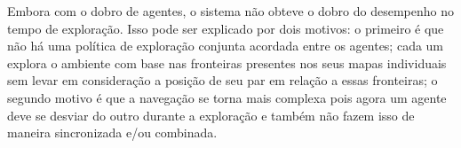 Embora com o dobro de agentes, o sistema não obteve o dobro do 
desempenho no tempo de exploração. Isso pode ser explicado por dois motivos: o primeiro é que não há uma 
política de exploração conjunta acordada entre os agentes; cada um 
explora o ambiente com base nas fronteiras presentes nos seus mapas 
individuais sem levar em consideração a posição de seu par em relação 
a essas fronteiras; o segundo motivo é que a navegação se torna mais 
complexa pois agora um agente deve se desviar do outro durante a 
exploração e também não fazem isso de maneira sincronizada e/ou combinada.




